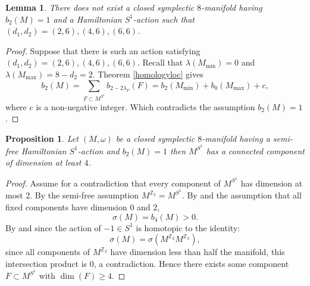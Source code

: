 \documentclass[12pt]{article}
\newtheorem{proposition}[theorem]{Proposition}
\newtheorem{lemma}[theorem]{Lemma}
\begin{document}
\begin{lemma} \label{ruleoutone} There does not exist a closed symplectic $8$-manifold having $b_{2}(M) =1$ and a Hamiltonian $S^1$-action such that $(d_1,d_2) = (2,6),(4,6), (6,6)$. 
\end{lemma}
\begin{proof}
Suppose that there is such an action satisfying $(d_1,d_2) = (2,6),(4,6), (6,6)$. Recall that $\lambda(M_{\min})=0$ and $\lambda(M_{\max}) = 8-d_2 = 2$. Theorem \ref{homologyloc}  gives $$ b_{2}(M) =  \sum_{F \subset M^{S^1}} b_{2-2\lambda_{F}}(F) = b_{2}(M_{\min}) + b_{0}(M_{\max}) + c, $$ where $c$ is a non-negative integer. Which contradicts the assumption $b_{2}(M)=1$.
\end{proof}

\begin{proposition} \label{existfour}
Let $(M,\omega)$ be a closed symplectic $8$-manifold having a semi-free Hamiltonian $S^1$-action and $b_{2}(M)=1$ then $M^{S^1}$ has a connected component of dimension at least $4$.
\end{proposition}
\begin{proof}
Assume for a contradiction that every component of $M^{S^1}$ has dimension at most $2$. By the semi-free assumption $M^{\mathbb{Z}_2} = M^{S^1}$. By \cite[Theorem 3.4]{L2} and the assumption that all fixed components have dimension $0$ and $2$, $$\sigma(M) =  b_{4}(M) > 0.$$ By \cite[Main Result]{JO} and since the action of $- 1 \in S^1$ is homotopic to the identity: $$\sigma(M) = \sigma(M^{\mathbb{Z}_2}M^{\mathbb{Z}_2}) ,$$ since all components of $M^{\mathbb{Z}_2}$ have dimension less than half the manifold,  this intersection product is $0$, a contradiction. Hence there exists some component $F \subset M^{S^1}$ with $\dim(F) \geq 4$.
\end{proof}
\end{document}
